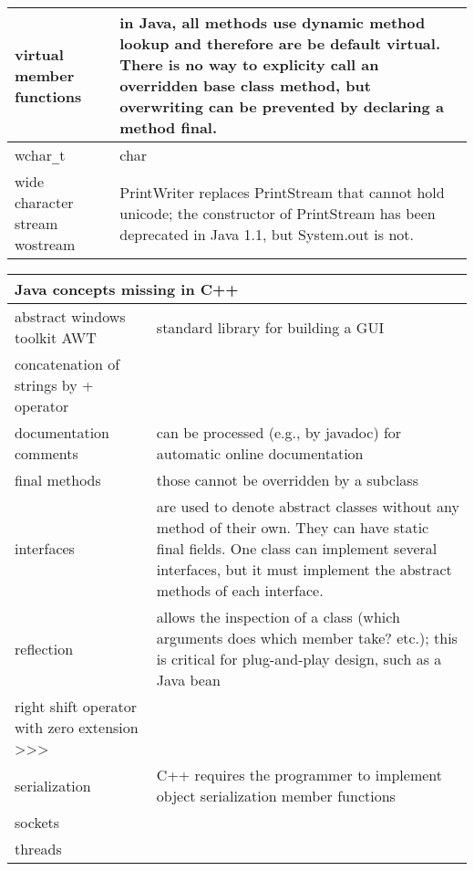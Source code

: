 \documentclass[12pt]{article}
\newcommand{\mycr}{\\\hline}
\newlength{\colwidth}\setlength{\colwidth}{\textwidth}
\newenvironment{mytabular}%
{\par\noindent
\begin{longtable}[l]{%
|p{\colwidth}%
p{\colwidth}|%
}%
}%
{\end{longtable}\par\vspace{\medskipamount}\goodbreak}
\newenvironment{mytabular}
{
\begin{tabular}[t]{|ll|}
}
{
\end{tabular}
}
\newcommand{\code}[1]{{\ttfamily #1}}
\begin{document}
\begin{mytabular}
\code{virtual} member functions
  & in Java, all methods use dynamic method lookup
    and therefore are be default virtual. There is no way
    to explicity call an overridden base class method,
    but overwriting can be prevented by declaring a
    method \code{final}.
  \mycr

\code{wchar}\verb!_!\code{t} & \code{char} \mycr

wide character stream \code{wostream}
   & \code{PrintWriter} replaces \code{PrintStream} 
   that cannot hold unicode;
   the constructor of \code{PrintStream} has been
   deprecated in Java 1.1, but \code{System.out} is not. \mycr
\end{mytabular}

\begin{mytabular}
\hline
\multicolumn{2}{|l|}{\bfseries Java concepts missing in C++}\mycr
\endhead
abstract windows toolkit AWT & standard library for building a GUI \mycr

concatenation of strings by \code{+} operator & \mycr

documentation comments & can be processed (e.g., by \code{javadoc})
   for automatic online documentation \mycr

\code{final} methods & those cannot be overridden by a subclass \mycr

interfaces & are used to denote abstract classes without any
   method of their own. They can have \code{static final} fields.
   One class can implement several interfaces, but it
   must implement the abstract methods of each interface. \mycr

reflection & 
   allows the inspection of a class
   (which arguments does which member take? etc.);
   this is critical for plug-and-play design, such
   as a Java bean \mycr

right shift operator with zero extension \code{>}\code{>}\code{>} & \mycr

serialization &
   C++ requires the programmer to implement object
   serialization member functions \mycr

sockets & \mycr

threads & \mycr
\end{mytabular}
\end{document}
